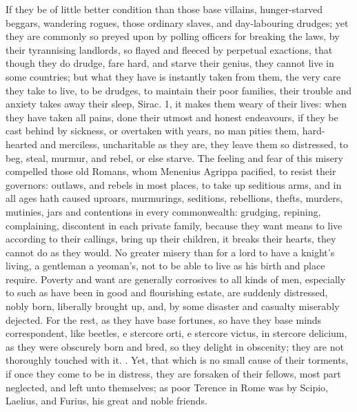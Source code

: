 {If they be of little better condition than those base villains,
hunger-starved beggars, wandering rogues, those ordinary slaves, and
day-labouring drudges; yet they are commonly so preyed upon by 
polling officers for breaking the laws, by their tyrannising landlords,
so flayed and fleeced by perpetual exactions, that though they do
drudge, fare hard, and starve their genius, they cannot live in
some countries; but what they have is instantly taken from them,
the very care they take to live, to be drudges, to maintain their poor
families, their trouble and anxiety takes away their sleep, Sirac.
 1, it makes them weary of their lives: when they have taken all
pains, done their utmost and honest endeavours, if they be cast behind
by sickness, or overtaken with years, no man pities them, hard-hearted
and merciless, uncharitable as they are, they leave them so distressed,
to beg, steal, murmur, and  rebel, or else starve. The feeling
and fear of this misery compelled those old Romans, whom Menenius
Agrippa pacified, to resist their governors: outlaws, and rebels in
most places, to take up seditious arms, and in all ages hath caused
uproars, murmurings, seditions, rebellions, thefts, murders, mutinies,
jars and contentions in every commonwealth: grudging, repining,
complaining, discontent in each private family, because they want means
to live according to their callings, bring up their children, it breaks
their hearts, they cannot do as they would. No greater misery than for
a lord to have a knight's living, a gentleman a yeoman's, not to be
able to live as his birth and place require. Poverty and want are
generally corrosives to all kinds of men, especially to such as have
been in good and flourishing estate, are suddenly distressed,
nobly born, liberally brought up, and, by some disaster and
casualty miserably dejected. For the rest, as they have base fortunes,
so have they base minds correspondent, like beetles, e stercore orti, e
stercore victus, in stercore delicium, as they were obscurely born and
bred, so they delight in obscenity; they are not thoroughly touched
with it. . Yet, that
which is no small cause of their torments, if once they come to be in
distress, they are forsaken of their fellows, most part neglected, and
left unto themselves; as poor Terence in Rome was by Scipio,
Laelius, and Furius, his great and noble friends.
%
\begin{latin}

\end{latin}}

